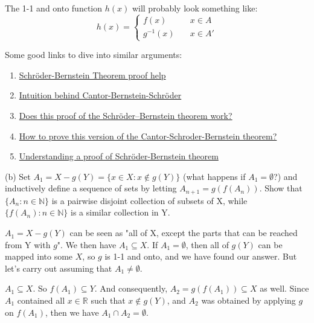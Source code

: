 The 1-1 and onto function $h(x)$ will probably look something like:
\begin{equation}
    h(x) =
      \begin{cases}
        f(x)       & \quad x \in A\\
        g^{-1}(x)  & \quad x \in A'
      \end{cases}
\end{equation}

Some good links to dive into similar arguments:
\begin{enumerate}
    \item \href{https://math.stackexchange.com/questions/3982170/schr%C3%B6der-bernstein-theorem-proof-help}{Schröder-Bernstein Theorem proof help}
    \item \href{https://math.stackexchange.com/questions/225576/intuition-behind-cantor-bernstein-schr%C3%B6der}{Intuition behind Cantor-Bernstein-Schröder}
    \item \href{https://math.stackexchange.com/questions/3296321/does-this-proof-of-the-schr%C3%B6der-bernstein-theorem-work}{Does this proof of the Schröder–Bernstein theorem work?}
    \item \href{https://math.stackexchange.com/questions/925203/how-to-prove-this-version-of-the-cantor-schroder-bernstein-theorem}{How to prove this version of the Cantor-Schroder-Bernstein theorem?}
    \item \href{https://math.stackexchange.com/questions/1726578/understanding-a-proof-of-schr%C3%B6der-bernstein-theorem}{Understanding a proof of Schröder-Bernstein theorem}
\end{enumerate}


(b) Set $A_1 = X - g(Y) = \{x \in X: x \notin g(Y)\}$ (what happens if $A_1 = \emptyset$?)
and inductively define a sequence of sets by letting $A_{n+1} = g(f(A_n))$.
Show that $\{A_n: n \in \mathbb{N} \}$ is a pairwise disjoint collection of subsets of X,
while $\{ f(A_n): n \in \mathbb{N} \}$ is a similar collection in Y.

$A_1 = X - g(Y)$ can be seen as "all of X, except the parts that can be reached from Y with $g$".
We then have $A_1 \subseteq X$.
If $A_1 = \emptyset$, then all of $g(Y)$ can be mapped into some $X$, so $g$ is 1-1 and onto,
and we have found our answer.
But let's carry out assuming that $A_1 \neq \emptyset$.

$A_1 \subseteq X$.
So $f(A_1) \subseteq Y$.
And consequently, $A_2 = g(f(A_1)) \subseteq X$ as well.
Since $A_1$ contained all $x \in \mathbb{R}$ such that $x \notin g(Y)$,
and $A_2$ was obtained by applying $g$ on $f(A_1)$, then we have $A_1 \cap A_2 = \emptyset$.

